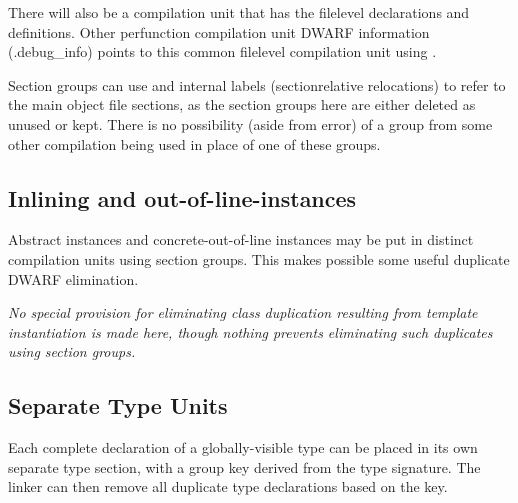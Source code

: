 There will also be a compilation unit that has the file\dash level
declarations and definitions. Other per\dash function compilation
unit DWARF information (.debug\_info) points to this common
file\dash level compilation unit using .

Section groups can use  and internal labels
(section\dash relative relocations) to refer to the main object
file sections, as the section groups here are either deleted
as unused or kept. There is no possibility (aside from error)
of a group from some other compilation being used in place
of one of these groups.


\subsection{Inlining and out-of-line-instances}
\label{app:inliningandoutoflineinstances}

Abstract instances and concrete-out-of-line instances may be
put in distinct compilation units using section groups. This
makes possible some useful duplicate DWARF elimination.

\textit{No special provision for eliminating class duplication
resulting from template instantiation is made here, though
nothing prevents eliminating such duplicates using section
groups.}


\subsection{Separate Type Units}
\label{app:separatetypeunits}

Each complete declaration of a globally-visible type can be
placed in its own separate type section, with a group key
derived from the type signature. The linker can then remove
all duplicate type declarations based on the key.

